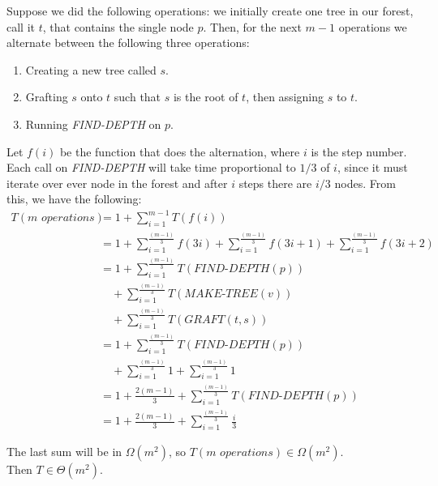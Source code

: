 \documentclass[letterpaper,10pt]{article}
\begin{document}
\begin{enumerate}
\begin{enumerate}
    Suppose we did the following operations: we initially create one tree in our forest, call it $t$, that contains the single node $p$. Then, for the next $m-1$ operations we alternate between the following three operations:
    \begin{enumerate}[1.]
      \item Creating a new tree called $s$.
      \item Grafting $s$ onto $t$ such that $s$ is the root of $t$, then assigning $s$ to $t$.
      \item Running \textit{FIND-DEPTH} on $p$.
    \end{enumerate}
    Let $f(i)$ be the function that does the alternation, where $i$ is the step number. Each call on \textit{FIND-DEPTH} will take time proportional to $1/3$ of $i$, since it must iterate over ever node in the forest and after $i$ steps there are $i/3$ nodes. From this, we have the following:
    \begin{align*}
      T(\textit{m operations}) &= 1 + \sum_{i=1}^{m-1} T(f(i)) \\
      &= 1 + \sum_{i=1}^{\frac{(m-1)}{3}} f(3i) + \sum_{i=1}^{\frac{(m-1)}{3}} f(3i + 1) + \sum_{i=1}^{\frac{(m-1)}{3}} f(3i+2) \\
      &= 1 +\sum_{i=1}^{\frac{(m-1)}{3}} T(\textit{FIND-DEPTH}(p)) \\ & \quad + \sum_{i=1}^{\frac{(m-1)}{3}} T(\textit{MAKE-TREE}(v)) \\ & \quad + \sum_{i=1}^{\frac{(m-1)}{3}} T(\textit{GRAFT}(t, s)) \\
      &= 1 + \sum_{i=1}^{\frac{(m-1)}{3}} T(\textit{FIND-DEPTH}(p)) \\ & \quad + \sum_{i=1}^{\frac{(m-1)}{3}} 1 + \sum_{i=1}^{\frac{(m-1)}{3}} 1 \\
      &= 1 + \frac{2(m-1)}{3} + \sum_{i=1}^{\frac{(m-1)}{3}} T(\textit{FIND-DEPTH}(p)) \\
      &= 1 + \frac{2(m-1)}{3} + \sum_{i=1}^{\frac{(m-1)}{3}} \frac{i}{3}
    \end{align*}

The last sum will be in $\Omega(m^2)$, so $T(\textit{m operations}) \in \Omega(m^2)$.
\\Then $T \in \Theta(m^2)$.


\end{enumerate}
\end{enumerate}
\end{document}
